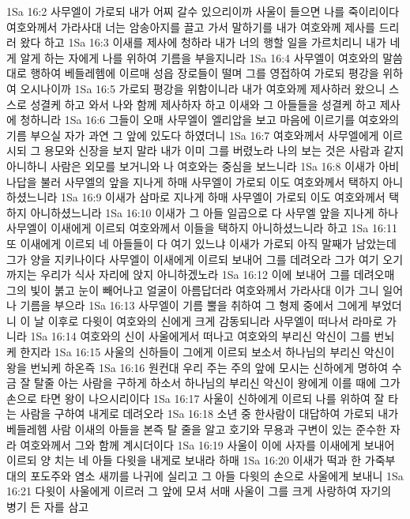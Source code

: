 1Sa 16:2  사무엘이 가로되 내가 어찌 갈수 있으리이까 사울이 들으면 나를 죽이리이다 여호와께서 가라사대 너는 암송아지를 끌고 가서 말하기를 내가 여호와께 제사를 드리러 왔다 하고
1Sa 16:3  이새를 제사에 청하라 내가 너의 행할 일을 가르치리니 내가 네게 알게 하는 자에게 나를 위하여 기름을 부을지니라
1Sa 16:4  사무엘이 여호와의 말씀대로 행하여 베들레헴에 이르매 성읍 장로들이 떨며 그를 영접하여 가로되 평강을 위하여 오시나이까
1Sa 16:5  가로되 평강을 위함이니라 내가 여호와께 제사하러 왔으니 스스로 성결케 하고 와서 나와 함께 제사하자 하고 이새와 그 아들들을 성결케 하고 제사에 청하니라
1Sa 16:6  그들이 오매 사무엘이 엘리압을 보고 마음에 이르기를 여호와의 기름 부으실 자가 과연 그 앞에 있도다 하였더니
1Sa 16:7  여호와께서 사무엘에게 이르시되 그 용모와 신장을 보지 말라 내가 이미 그를 버렸노라 나의 보는 것은 사람과 같지 아니하니 사람은 외모를 보거니와 나 여호와는 중심을 보느니라
1Sa 16:8  이새가 아비나답을 불러 사무엘의 앞을 지나게 하매 사무엘이 가로되 이도 여호와께서 택하지 아니하셨느니라
1Sa 16:9  이새가 삼마로 지나게 하매 사무엘이 가로되 이도 여호와께서 택하지 아니하셨느니라
1Sa 16:10  이새가 그 아들 일곱으로 다 사무엘 앞을 지나게 하나 사무엘이 이새에게 이르되 여호와께서 이들을 택하지 아니하셨느니라 하고
1Sa 16:11  또 이새에게 이르되 네 아들들이 다 여기 있느냐 이새가 가로되 아직 말째가 남았는데 그가 양을 지키나이다 사무엘이 이새에게 이르되 보내어 그를 데려오라 그가 여기 오기까지는 우리가 식사 자리에 앉지 아니하겠노라
1Sa 16:12  이에 보내어 그를 데려오매 그의 빛이 붉고 눈이 빼어나고 얼굴이 아름답더라 여호와께서 가라사대 이가 그니 일어나 기름을 부으라
1Sa 16:13  사무엘이 기름 뿔을 취하여 그 형제 중에서 그에게 부었더니 이 날 이후로 다윗이 여호와의 신에게 크게 감동되니라 사무엘이 떠나서 라마로 가니라
1Sa 16:14  여호와의 신이 사울에게서 떠나고 여호와의 부리신 악신이 그를 번뇌케 한지라
1Sa 16:15  사울의 신하들이 그에게 이르되 보소서 하나님의 부리신 악신이 왕을 번뇌케 하온즉
1Sa 16:16  원컨대 우리 주는 주의 앞에 모시는 신하에게 명하여 수금 잘 탈줄 아는 사람을 구하게 하소서 하나님의 부리신 악신이 왕에게 이를 때에 그가 손으로 타면 왕이 나으시리이다
1Sa 16:17  사울이 신하에게 이르되 나를 위하여 잘 타는 사람을 구하여 내게로 데려오라
1Sa 16:18  소년 중 한사람이 대답하여 가로되 내가 베들레헴 사람 이새의 아들을 본즉 탈 줄을 알고 호기와 무용과 구변이 있는 준수한 자라 여호와께서 그와 함께 계시더이다
1Sa 16:19  사울이 이에 사자를 이새에게 보내어 이르되 양 치는 네 아들 다윗을 내게로 보내라 하매
1Sa 16:20  이새가 떡과 한 가죽부대의 포도주와 염소 새끼를 나귀에 실리고 그 아들 다윗의 손으로 사울에게 보내니
1Sa 16:21  다윗이 사울에게 이르러 그 앞에 모셔 서매 사울이 그를 크게 사랑하여 자기의 병기 든 자를 삼고
